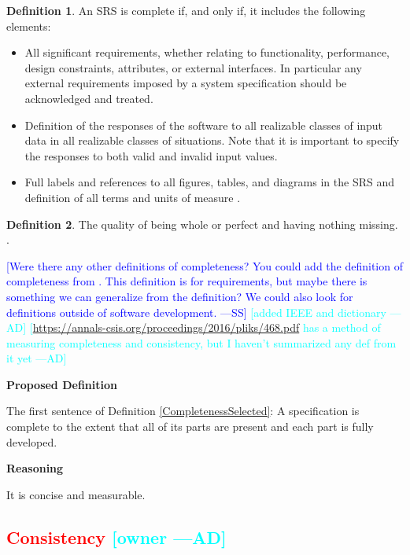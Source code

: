 \documentclass[letterpaper,cleveref]{lipics-v2019}
\newcommand{\authornote}[3]{\textcolor{#1}{[#3 ---#2]}}
\newcommand{\authornote}[3]{}
\newcommand{\wss}[1]{\authornote{blue}{SS}{#1}} %
\newcommand{\ad}[1]{\authornote{cyan}{AD}{#1}} %
\newcommand{\notdone}[1]{\textcolor{red}{#1}}
\theoremstyle{definition}
\newtheorem{defn}{Definition}
\begin{document}
\begin{defn}
	An SRS is complete if, and only if, it includes the following elements:
\begin{itemize}
\item All significant requirements, whether relating to functionality,
performance, design constraints, attributes, or external interfaces. In
particular any external requirements imposed by a system specification should be
acknowledged and treated.
\item Definition of the responses of the software to all realizable classes of
input data in all realizable classes of situations. Note that it is important to
specify the responses to both valid and invalid input values.
\item Full labels and references to all figures, tables, and diagrams in the SRS
and definition of all terms and units of measure \citep{IEEE1998}.
	\end{itemize}
\end{defn}
\begin{defn}
The quality of being whole or perfect and having nothing missing.
\citep{CambridgeCompleteness2019}.
\end{defn}

\wss{Were there any other definitions of completeness?  You could add the
	definition of completeness from \citet[p.\ 5--6]{IEEE1998}.  This definition
	is for
	requirements, but maybe there is something we can generalize from the
	definition?  We could also look for definitions outside of software
	development.}
\ad{added IEEE and dictionary}
\ad{\url{https://annals-csis.org/proceedings/2016/pliks/468.pdf} has a method of
measuring completeness and consistency, but I haven't summarized any def from it
yet}

\noindent \textbf{Proposed Definition} 

The first sentence of Definition \ref{CompletenessSelected}: A specification is
complete to the extent that all of its parts are present and each part is fully
developed.

\noindent \textbf{Reasoning}

It is concise and measurable.

\subsection{\notdone{Consistency} \ad{owner}}
\end{document}
